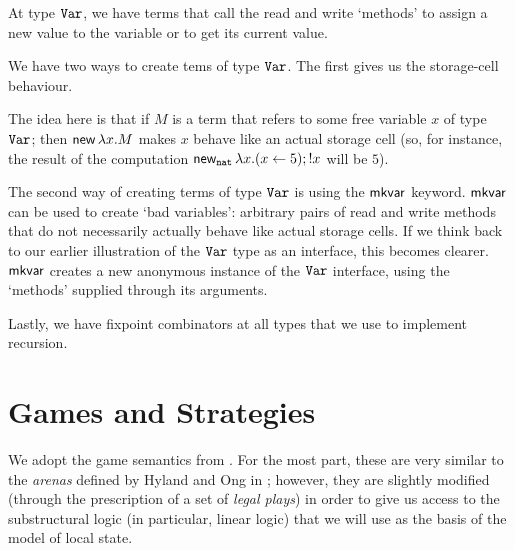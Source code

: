 At type $\Var$, we have terms that call the read and write `methods' to assign a new value to the variable or to get its current value.

We have two ways to create tems of type $\Var$.  
The first gives us the storage-cell behaviour.
\begin{mathpar}
\end{mathpar}
The idea here is that if $M$ is a term that refers to some free variable $x$ of type $\Var$; then $\neww \lambda x.M$ makes $x$ behave like an actual storage cell (so, for instance, the result of the computation $\neww_\nat \lambda x.(x\gets 5);!x$ will be $5$).

The second way of creating terms of type $\Var$ is using the $\mkvar$ keyword.  
$\mkvar$ can be used to create `bad variables': arbitrary pairs of read and write methods that do not necessarily actually behave like actual storage cells.
If we think back to our earlier illustration of the $\Var$ type as an interface, this becomes clearer.  
$\mkvar$ creates a new anonymous instance of the $\Var$ interface, using the `methods' supplied through its arguments.
\begin{mathpar}
\end{mathpar}

Lastly, we have fixpoint combinators at all types that we use to implement recursion.
\begin{mathpar}
\end{mathpar}

\section{Games and Strategies}

We adopt the game semantics from \cite{SamsonGuyIAActive}.  
For the most part, these are very similar to the \emph{arenas} defined by Hyland and Ong in \cite{hoPcf}; however, they are slightly modified (through the prescription of a set of \emph{legal plays}) in order to give us access to the substructural logic (in particular, linear logic) that we will use as the basis of the model of local state.


